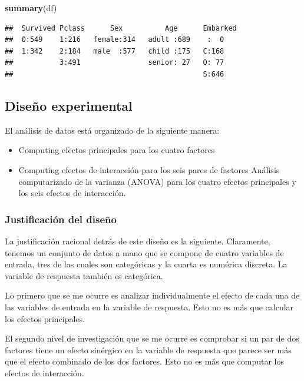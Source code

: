 \documentclass[]{article}
\newenvironment{Shaded}{\begin{snugshade}}{\end{snugshade}}
\newcommand{\KeywordTok}[1]{\textcolor[rgb]{0.13,0.29,0.53}{\textbf{#1}}}
\newcommand{\NormalTok}[1]{#1}
\providecommand{\tightlist}{%
  \setlength{\itemsep}{0pt}\setlength{\parskip}{0pt}}
\begin{document}
\begin{Shaded}
\begin{Highlighting}[]
\KeywordTok{summary}\NormalTok{(df)}
\end{Highlighting}
\end{Shaded}

\begin{verbatim}
##  Survived Pclass      Sex          Age      Embarked
##  0:549    1:216   female:314   adult :689    :  0   
##  1:342    2:184   male  :577   child :175   C:168   
##           3:491                senior: 27   Q: 77   
##                                             S:646
\end{verbatim}

\subsection{Diseño experimental}\label{diseno-experimental}

El análisis de datos está organizado de la siguiente manera:

\begin{itemize}
\tightlist
\item
  Computing efectos principales para los cuatro factores
\item
  Computing efectos de interacción para los seis pares de factores
  Análisis computarizado de la varianza (ANOVA) para los cuatro efectos
  principales y los seis efectos de interacción.
\end{itemize}

\subsubsection{Justificación del diseño}\label{justificacion-del-diseno}

La justificación racional detrás de este diseño es la siguiente.
Claramente, tenemos un conjunto de datos a mano que se compone de cuatro
variables de entrada, tres de las cuales son categóricas y la cuarta es
numérica discreta. La variable de respuesta también es categórica.

Lo primero que se me ocurre es analizar individualmente el efecto de
cada una de las variables de entrada en la variable de respuesta. Esto
no es más que calcular los efectos principales.

El segundo nivel de investigación que se me ocurre es comprobar si un
par de dos factores tiene un efecto sinérgico en la variable de
respuesta que parece ser más que el efecto combinado de los dos
factores. Esto no es más que computar los efectos de interacción.
\end{document}
